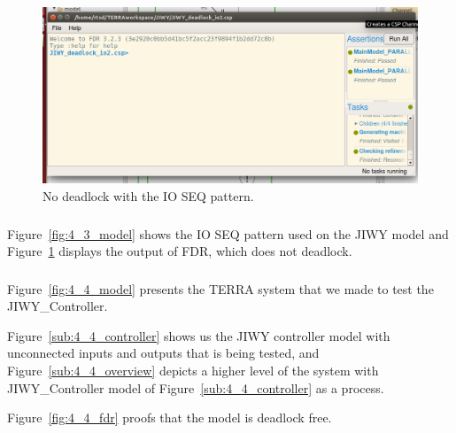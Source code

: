 \documentclass[a4paper,twoside,11pt]{article}
\begin{document}
\begin{figure}
	\centering
	\includegraphics[width=\textwidth]{./images/4-3_fdr.png}
	\caption{No deadlock with the IO SEQ pattern.}
	\label{fig:4_3_fdr}
\end{figure}

\subsubsection{}
Figure~\ref{fig:4_3_model} shows the IO SEQ pattern used on the JIWY model and 
Figure~\ref{fig:4_3_fdr} displays the output of FDR, which does not deadlock.

\subsubsection{}
Figure~\ref{fig:4_4_model} presents the TERRA system that we made to test the JIWY\_Controller.

Figure~\ref{sub:4_4_controller} shows us the JIWY controller model with unconnected inputs and outputs that is being tested,
and Figure~\ref{sub:4_4_overview} depicts a higher level of the system with JIWY\_Controller model of Figure~\ref{sub:4_4_controller} as a process.  

Figure~\ref{fig:4_4_fdr} proofs that the model is deadlock free.
\end{document}
